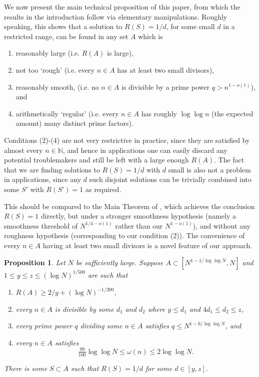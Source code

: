 \documentclass{amsart}
\newcommand{\bbn}{\mathbb{N}}
\newtheorem{proposition}{Proposition}
\begin{document}
We now present the main technical proposition of this paper, from which the results in the introduction follow via elementary manipulations. Roughly speaking, this shows that a solution to $R(S)=1/d$, for some small $d$ in a restricted range, can be found in any set $A$ which is 
\begin{enumerate}
\item reasonably large (i.e. $R(A)$ is large),
\item not too `rough' (i.e. every $n\in A$ has at least two small divisors),
\item reasonably smooth, (i.e. no $n\in A$ is divisible by a prime power $q>n^{1-o(1)}$), and
\item arithmetically `regular' (i.e. every $n\in A$ has roughly $\log\log n$ (the expected amount) many distinct prime factors).
\end{enumerate}
Conditions (2)-(4) are not very restrictive in practice, since they are satisfied by almost every $n\in \bbn$, and hence in applications one can easily discard any potential troublemakers and still be left with a large enough $R(A)$. The fact that we are finding solutions to $R(S)=1/d$ with $d$ small is also not a problem in applications, since any $d$ such disjoint solutions can be trivially combined into some $S'$ with $R(S')=1$ as required.

This should be compared to the Main Theorem of \cite{Cr2003}, which achieves the conclusion $R(S)=1$ directly, but under a stronger smoothness hypothesis (namely a smoothness threshold of $N^{1/4-o(1)}$ rather than our $N^{1-o(1)}$), and without any roughness hypothesis (corresponding to our condition (2)). The convenience of every $n\in A$ having at least two small divisors is a novel feature of our approach.


\begin{proposition}\label{th-techmain}
Let $N$ be sufficiently large. Suppose $A\subset [N^{1-1/\log\log N},N]$ and $1\leq y\leq z\leq (\log N)^{1/500}$ are such that
\begin{enumerate}
\item $R(A)\geq 2/y+(\log N)^{-1/200}$,
\item every $n\in A$ is divisible by some $d_1$ and $d_2$ where $y\leq d_1$ and $4d_1\leq d_2\leq z$,
\item every prime power $q$ dividing some $n\in A$ satisfies $q\leq N^{1-6/\log\log N}$, and
\item every $n\in A$ satisfies
\[\tfrac{99}{100}\log\log N\leq \omega(n) \leq 2\log\log N.\]
\end{enumerate}
There is some $S\subset A$ such that $R(S)=1/d$ for some $d\in [y,z]$.
\end{proposition}
\end{document}
